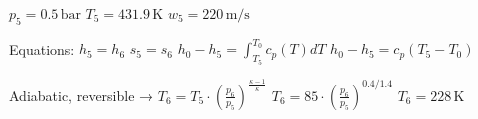 \( p_5 = 0.5 \, \text{bar} \)  
\( T_5 = 431.9 \, \text{K} \)  
\( w_5 = 220 \, \text{m/s} \)  

Equations:  
\( h_5 = h_6 \)  
\( s_5 = s_6 \)  
\( h_0 - h_5 = \int_{T_5}^{T_0} c_p(T) dT \)  
\( h_0 - h_5 = c_p (T_5 - T_0) \)  

Adiabatic, reversible → \( T_6 = T_5 \cdot \left( \frac{p_6}{p_5} \right)^{\frac{\kappa - 1}{\kappa}} \)  
\( T_6 = 85 \cdot \left( \frac{p_6}{p_5} \right)^{0.4 / 1.4} \)  
\( T_6 = 228 \, \text{K} \)